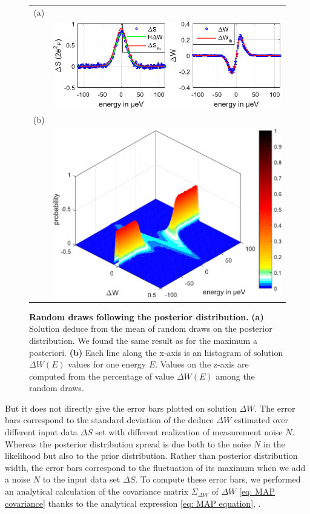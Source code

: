\begin{figure}[hptb]
	\begin{center}
		\begin{tabular}{c c}
			(a) &  \\ 
			
			& \includegraphics[width = 10 cm]{./appA/PM_for_MAP_posterior_distribution} \\ 
			
			(b) &  \\ 
			
			& \includegraphics[width = 10 cm]{./appA/MAP_posterior_distribution}
		\end{tabular} 
	\end{center}
	
	\caption{\textbf{Random draws following the posterior distribution.} \textbf{(a)} Solution deduce from the mean of random draws on the posterior distribution. We found the same result as for the maximum a posteriori. \textbf{(b)} Each line along the x-axis is an histogram of solution $\Delta W\left(E\right)$ values for one energy $E$. Values on the z-axis are computed from the percentage of value $\Delta W\left(E\right)$ among the random draws.}
	\label{fig: PM_for_MAP}
\end{figure}


But it does not directly give the error bars plotted on solution $\Delta W$. The error bars correspond to the standard deviation of the deduce $\Delta W$ estimated over different input data $\Delta S$ set with different realization of measurement noise $N$. Whereas the posterior distribution spread is due both to the noise $N$ in the likelihood but also to the prior distribution. Rather than posterior distribution width, the error bars correspond to the fluctuation of its maximum when we add a noise $N$ to the input data set $\Delta S$. To compute these error bars, we performed an analytical calculation of  the covariance matrix $\Sigma_{\Delta W}$ of $\Delta W$ \eqref{eq: MAP covariance} thanks to the analytical expression \eqref{eq: MAP equation}, \cite{fessler1996mean}.


